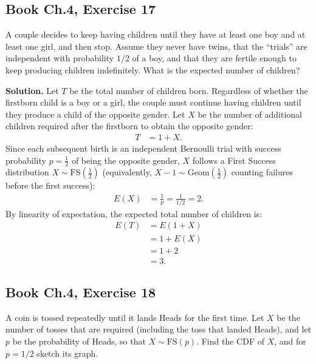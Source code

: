 \documentclass[11pt,a4paper]{article}
\begin{document}
\vspace{10pt}
\subsection{Book Ch.4, Exercise 17}
\begin{tcolorbox}[title={Book Ch.4, Exercise 17}]
A couple decides to keep having children until they have at least one boy and at least one girl, and then stop. Assume they never have twins, that the ``trials'' are independent with probability $1/2$ of a boy, and that they are fertile enough to keep producing children indefinitely. What is the expected number of children?
\end{tcolorbox}

\noindent \textbf{Solution.} Let $T$ be the total number of children born. Regardless of whether the firstborn child is a boy or a girl, the couple must continue having children until they produce a child of the opposite gender. Let $X$ be the number of additional children required after the firstborn to obtain the opposite gender:
\begin{align*}
T &= 1 + X.
\end{align*}
Since each subsequent birth is an independent Bernoulli trial with success probability $p = \frac{1}{2}$ of being the opposite gender, $X$ follows a First Success distribution $X \sim \text{FS}\left(\frac{1}{2}\right)$ (equivalently, $X - 1 \sim \text{Geom}\left(\frac{1}{2}\right)$ counting failures before the first success):
\begin{align*}
E(X) &= \frac{1}{p} = \frac{1}{1/2} = 2.
\end{align*}
By linearity of expectation, the expected total number of children is:
\begin{align*}
E(T) &= E(1 + X) \\
&= 1 + E(X) \\
&= 1 + 2 \\
&= 3.
\end{align*}

\vspace{10pt}
\subsection{Book Ch.4, Exercise 18}
\begin{tcolorbox}[title={Book Ch.4, Exercise 18}]
A coin is tossed repeatedly until it lands Heads for the first time. Let $X$ be the number of tosses that are required (including the toss that landed Heads), and let $p$ be the probability of Heads, so that $X \sim \text{FS}(p)$. Find the CDF of $X$, and for $p = 1/2$ sketch its graph.
\end{tcolorbox}
\end{document}

